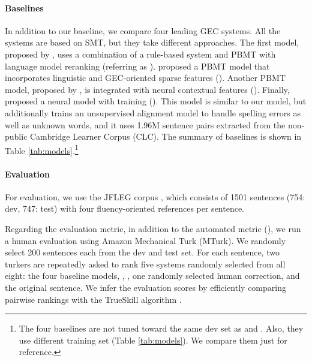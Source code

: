 \vspace{-1mm}
\paragraph{Baselines}
In addition to our \mle baseline, we compare four leading GEC systems. 
All the systems are based on SMT, but they take different approaches.
The first model, proposed by , uses a combination of a rule-based system and PBMT with language model reranking (referring as \cambhybrid).
 proposed a PBMT model that incorporates linguistic and GEC-oriented sparse features (\amu).
Another PBMT model, proposed by , is integrated with neural contextual features (\nus).
Finally,  proposed a neural \encdec model with \mle training (\cambnmt). 
This model is similar to our \mle model, but \cambnmt additionally trains an unsupervised alignment model to handle spelling errors as well as unknown words, and it uses 1.96M sentence pairs extracted from the non-public Cambridge Learner Corpus (CLC).
The summary of baselines is shown in Table \ref{tab:models}.\footnote{The four baselines are not tuned toward the same dev set as \mle and \proposed. Also, they use different training set (Table \ref{tab:models}). We compare them just for reference.}


\vspace{-1mm}
\paragraph{Evaluation}
For evaluation, we use the JFLEG corpus \cite{napoles-sakaguchi-tetreault:2017:EACLshort}, which consists of 1501 sentences (754: dev, 747: test) with four fluency-oriented references per sentence.

Regarding the evaluation metric, in addition to the automated metric (\metric), we run a human evaluation using Amazon Mechanical Turk (MTurk).
We randomly select 200 sentences each from the dev and test set.
For each sentence, two turkers are repeatedly asked to rank five systems randomly selected from all eight: the four baseline models, \mle, \proposed, one randomly selected human correction, and the original sentence.
We infer the evaluation scores by efficiently comparing pairwise rankings with the TrueSkill algorithm \cite{HerbrichMG06,sakaguchi-post-vandurme:2014:W14-33}.



